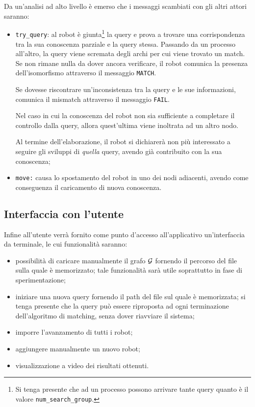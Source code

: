 \documentclass{llncs}
\begin{document}
Da un'analisi ad alto livello è emerso che i messaggi scambiati con
gli altri attori saranno:
\begin{itemize}
	\item \texttt{try\_query}: al robot è giunta\footnote{Si
	tenga presente che ad un processo possono arrivare tante query
	quanto è il valore \texttt{num\_search\_group}.} la query e prova
	a trovare una corrispondenza tra la sua conoscenza parziale e
	la query stessa. Passando da un processo all'altro, la query
	viene scremata degli archi per cui viene trovato un match.
	Se non rimane nulla da dover ancora verificare, il robot comunica la presenza dell'isomorfismo attraverso
	il messaggio \texttt{MATCH}.

	Se dovesse riscontrare un'inconsistenza tra la query e
	le sue informazioni, comunica il mismatch attraverso
	il messaggio \texttt{FAIL}.

	Nel caso in cui la conoscenza del robot non sia sufficiente a completare il controllo
	dalla query, allora quest'ultima viene inoltrata ad un altro nodo.

	Al termine dell'elaborazione, il robot si dichiarerà non più interessato
	a seguire gli sviluppi di \emph{quella} query, avendo già contribuito con la
	sua conoscenza;
	\item \texttt{move:} causa lo spostamento del robot in uno dei
	nodi adiacenti, avendo come conseguenza il caricamento
	di nuova conoscenza.
\end{itemize}

\subsection{Interfaccia con l'utente}
Infine all'utente verrà fornito come punto d'accesso all'applicativo
un'interfaccia da terminale, le cui funzionalità saranno:
\begin{itemize}
	\item possibilità di caricare manualmente il grafo $\mathcal{G}$ fornendo il percorso
	del file sulla quale è memorizzato; tale
	funzionalità sarà utile soprattutto in fase di sperimentazione;
	\item iniziare una nuova query fornendo il path del
	file sul quale è memorizzata; si tenga presente che la query
	può essere riproposta ad ogni terminazione dell'algoritmo di
	matching, senza dover riavviare il sistema;
	\item imporre l'avanzamento di tutti
	i robot;
	\item aggiungere manualmente un nuovo robot;
	\item visualizzazione a video dei risultati ottenuti.
\end{itemize}
\end{document}
